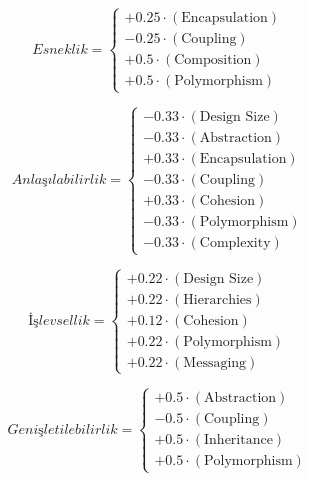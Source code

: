 \documentclass[conference]{IEEEtran}
\begin{document}
\begin{equation}
	\textit{Esneklik} =
	\begin{cases}
		+0.25 \cdot (\text{Encapsulation}) \\
		-0.25 \cdot (\text{Coupling}) \\
		+0.5 \cdot (\text{Composition}) \\
		+0.5 \cdot (\text{Polymorphism})
	\end{cases}
	\label{equ:flexibility}
\end{equation}

\begin{equation}
	\textit{Anlaşılabilirlik} =
	\begin{cases}
		-0.33 \cdot (\text{Design Size}) \\
		-0.33 \cdot (\text{Abstraction}) \\
		+0.33 \cdot (\text{Encapsulation}) \\
		-0.33 \cdot (\text{Coupling}) \\
		+0.33 \cdot (\text{Cohesion}) \\
		-0.33 \cdot (\text{Polymorphism}) \\
		-0.33 \cdot (\text{Complexity})
	\end{cases}
	\label{equ:understandability}
\end{equation}

\begin{equation}
	\textit{İşlevsellik} =
	\begin{cases}
		+0.22 \cdot (\text{Design Size}) \\
		+0.22 \cdot (\text{Hierarchies}) \\
		+0.12 \cdot (\text{Cohesion}) \\
		+0.22 \cdot (\text{Polymorphism}) \\
		+0.22 \cdot (\text{Messaging})
	\end{cases}
	\label{equ:functionality}
\end{equation}

\begin{equation}
	\textit{Genişletilebilirlik} =
	\begin{cases}
		+0.5 \cdot (\text{Abstraction}) \\
		-0.5 \cdot (\text{Coupling}) \\
		+0.5 \cdot (\text{Inheritance}) \\
		+0.5 \cdot (\text{Polymorphism})
	\end{cases}
	\label{equ:extensibility}
\end{equation}
\end{document}
